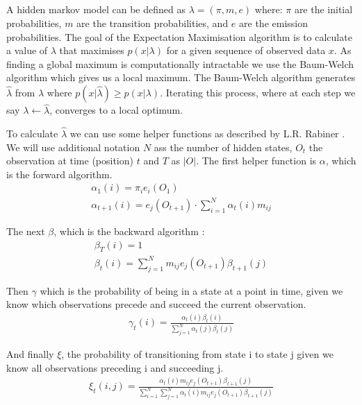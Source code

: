\subsection{}
A hidden markov model can be defined as $\lambda = (\pi, m, e)$ where: $\pi$ are the initial probabilities, $m$ are the transition probabilities, and $e$ are the emission probabilities.
The goal of the Expectation Maximisation algorithm is to calculate a value of $\lambda$ that maximises $p(x|\lambda)$ for a given sequence of observed data $x$. As finding a global maximum is computationally intractable we use the Baum-Welch algorithm which gives us a local maximum. The Baum-Welch algorithm generates $\hat{\lambda}$ from $\lambda$ where $p(x|\hat{\lambda}) \geq p(x|\lambda)$. Iterating this process, where at each step we say $\lambda \gets \hat{\lambda}$, converges to a local optimum.

To calculate $\hat{\lambda}$ we can use some helper functions as described by L.R. Rabiner \cite{em}. We will use additional notation $N$ ass the number of hidden states, $O_t$ the observation at time (position) $t$ and $T$ as $|O|$.  The first helper function is $\alpha$, which is the forward algorithm.
\begin{gather*}
    \alpha_1(i) = \pi_i e_i(O_1)\\
    \alpha_{t+1}(i) = e_j(O_{t+1}) \cdot \sum_{i=1}^N\alpha_t(i)m_{ij}
\end{gather*}

The next $\beta$, which is the backward algorithm :
\begin{gather*}
    \beta_T(i)=1\\
    \beta_t(i)=\sum_{j=1}^N m_{ij} e_j(O_{t+1}) \beta_{t+1}(j)
\end{gather*}

Then $\gamma$ which is the probability of being in a state at a point in time, given we know which observations precede and succeed the current observation.
\begin{gather*}
    \gamma_t(i) = \frac{\alpha_t(i) \beta_t(i)}{\sum_{j=1}^N \alpha_t(j) \beta_t(j)}
\end{gather*}

And finally $\xi$, the probability of transitioning from state i to state j given we know all observations preceding i and succeeding j.
\begin{gather*}
    \xi_t(i, j) = \frac{\alpha_t(i) m_{ij} e_j(O_{t+1}) \beta_{t+1}(j)}{\sum_{i=1}^N \sum_{j=1}^N \alpha_t(i) m_{ij} e_j(O_{t+1}) \beta_{t+1}(j)}
\end{gather*}

